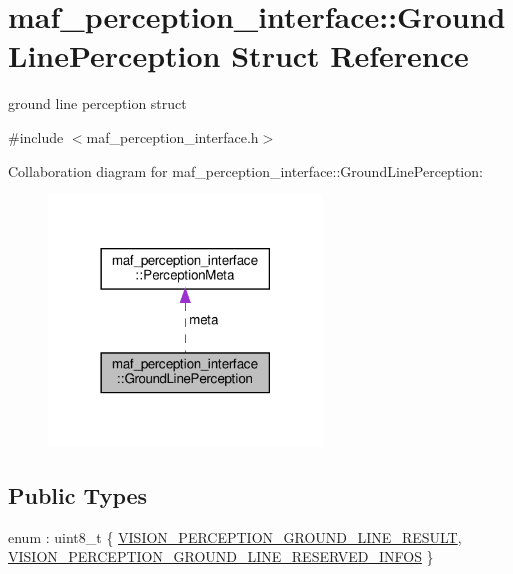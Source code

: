 \hypertarget{structmaf__perception__interface_1_1GroundLinePerception}{}\section{maf\+\_\+perception\+\_\+interface\+:\+:Ground\+Line\+Perception Struct Reference}
\label{structmaf__perception__interface_1_1GroundLinePerception}


ground line perception struct  




{\ttfamily \#include $<$maf\+\_\+perception\+\_\+interface.\+h$>$}



Collaboration diagram for maf\+\_\+perception\+\_\+interface\+:\+:Ground\+Line\+Perception\+:\nopagebreak
\begin{figure}[H]
\begin{center}
\leavevmode
\includegraphics[width=206pt]{structmaf__perception__interface_1_1GroundLinePerception__coll__graph}
\end{center}
\end{figure}
\subsection*{Public Types}
\begin{DoxyCompactItemize}
\item 
enum \+: uint8\+\_\+t \{ \hyperlink{structmaf__perception__interface_1_1GroundLinePerception_a50a63fcccbb87c61711780614d6c9d74ac952a5f552ccc37a57c99e010724ad8a}{V\+I\+S\+I\+O\+N\+\_\+\+P\+E\+R\+C\+E\+P\+T\+I\+O\+N\+\_\+\+G\+R\+O\+U\+N\+D\+\_\+\+L\+I\+N\+E\+\_\+\+R\+E\+S\+U\+LT}, 
\hyperlink{structmaf__perception__interface_1_1GroundLinePerception_a50a63fcccbb87c61711780614d6c9d74a846905c8b3ab955dc24585263ffcc5f6}{V\+I\+S\+I\+O\+N\+\_\+\+P\+E\+R\+C\+E\+P\+T\+I\+O\+N\+\_\+\+G\+R\+O\+U\+N\+D\+\_\+\+L\+I\+N\+E\+\_\+\+R\+E\+S\+E\+R\+V\+E\+D\+\_\+\+I\+N\+F\+OS}
 \}
\end{DoxyCompactItemize}
